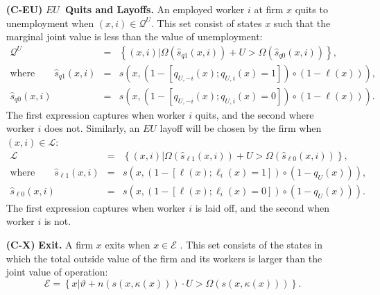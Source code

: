 \begin{enumerate}
\item[\textbf{(C-EU)}] $EU$\textbf{\ Quits and Layoffs.} An employed worker $%
i$ at firm $x$ quits to unemployment when $\left( x,i\right) \in \mathcal{Q}%
^{U}$. This set consist of states $x$ such that the marginal joint value is
less than the value of unemployment:
\begin{eqnarray*}
\mathcal{Q}^{U}&=&\left\{ (x,i)\Big|\Omega \left( \widehat{s}_{q1}\left(
x,i\right) \right) +U>\Omega \left( \widehat{s}_{q0}\left( x,i\right) \right)
\right\}, \\
\text{where}\quad\quad\widehat{s}_{q1}\left( x,i\right) &=&s\left( x,\left( 1-\left[ q_{U,-i}\left(
x\right) ;q_{U,i}\left( x\right) =1\right] \right) \circ \left( 1-\ell
\left( x\right) \right) \right), \\
\widehat{s}_{q0} \left( x,i\right) &=&s\left( x,\left( 1-\left[ q_{U,-i}\left(
x\right) ;q_{U,i}\left( x\right) =0\right] \right) \circ\left( 1-\ell \left(
x\right) \right)\right).
\end{eqnarray*}%
The first expression captures when worker $i$ quits, and the second where
worker $i$ does not.
Similarly, an $EU$ layoff will be chosen by the firm
when $\left( x,i\right) \in \mathcal{L}$:
\begin{eqnarray*}
\mathcal{L}&=&\left\{ (x,i)\Big|\Omega \left( \widehat{s}_{\ell 1}\left(
x,i\right) \right) +U>\Omega \left( \widehat{s}_{\ell 0}\left( x,i\right)
\right) \right\}, \\
\text{where}\quad\quad\widehat{s}_{\ell 1}\left( x,i\right) &=&s\left( x,\left( 1-\left[ \ell \left(
x\right) ;\ell _{i}\left( x\right) =1\right] \right) \circ \left(
1-q_{U}\left( x\right) \right) \right) , \\
\widehat{s}_{\ell 0}\left( x,i\right) &=&s\left( x,\left( 1-\left[ \ell \left(
x\right) ;\ell _{i}\left( x\right) =0\right] \right) \circ \left(
1-q_{U}\left( x\right) \right) \right) .
\end{eqnarray*}%
The first expression captures when worker $i$ is laid off, and the second
when worker $i$ is not.

\item[\textbf{(C-X)}] \textbf{Exit.} A firm $x$ exits when $x\in \mathcal{E}$%
. This set consists of the states in which the total outside value of the
firm and its workers is larger than the joint value of operation:
\begin{equation*}
\mathcal{E}=\left\{ x\Big|\vartheta +n\left( s\left( x,\kappa \left(
x\right) \right) \right) \cdot U>\Omega \left( s\left( x,\kappa \left(
x\right) \right) \right) \right\} .
\end{equation*}


\end{enumerate}
